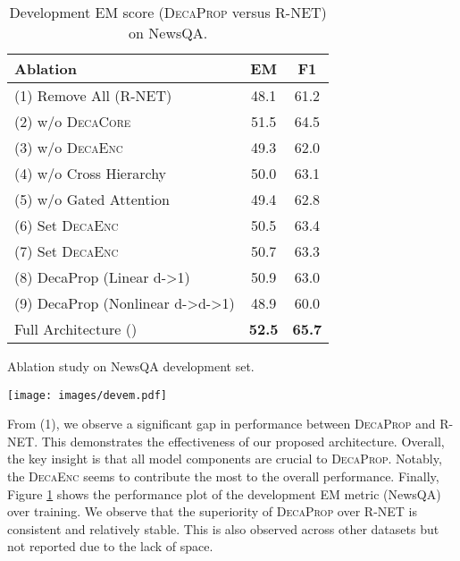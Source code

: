 \documentclass{article}
\begin{document}
 \begin{table}[htb]
  \begin{minipage}[c]{.46\linewidth}
    \centering
    \small
     \begin{tabular}{lcc}
     \hline
     Ablation & \multicolumn{1}{c}{EM} & \multicolumn{1}{c}{F1} \\
     \hline
     (1) Remove All (R-NET) &  48.1 & 61.2 \\
     (2) w/o \textsc{DecaCore}  & 51.5  & 64.5 \\
     (3) w/o \textsc{DecaEnc} & 49.3 & 62.0 \\
     (4) w/o Cross Hierarchy &   50.0    & 63.1  \\
         (5) w/o Gated Attention  & 49.4& 62.8 \\
    (6) Set \textsc{DecaEnc}  & 50.5  & 63.4 \\
     (7) Set \textsc{DecaEnc}  & 50.7  & 63.3 \\
  (8) DecaProp (Linear d->1) & 50.9 & 63.0 \\
(9) DecaProp (Nonlinear d->d->1) & 48.9 & 60.0 \\
     \hline
     Full Architecture ()& \textbf{52.5}  & \textbf{65.7} \\
     \hline
     \end{tabular}\vspace{0.2em}
     \caption{Ablation study on NewsQA development set.}
     \label{tab:ablation}
 \end{minipage}\hfill
 \begin{minipage}[c]{.5\linewidth}
   \centering
   \texttt{[image: images/devem.pdf]}
   \caption{Development EM score (\textsc{DecaProp} versus R-NET) on NewsQA.}
   \label{rnet}
 \end{minipage}
 \end{table}





From (1), we observe a significant gap in performance between \textsc{DecaProp} and R-NET. This demonstrates the effectiveness of our proposed architecture. Overall, the key insight is that all model components are crucial to \textsc{DecaProp}.  Notably, the \textsc{DecaEnc} seems to contribute the most to the overall performance. Finally, Figure \ref{rnet} shows the performance plot of the development EM metric (NewsQA) over training. We observe that the superiority of \textsc{DecaProp} over R-NET is consistent and relatively stable. This is also observed across other datasets but not reported due to the lack of space.
\end{document}
